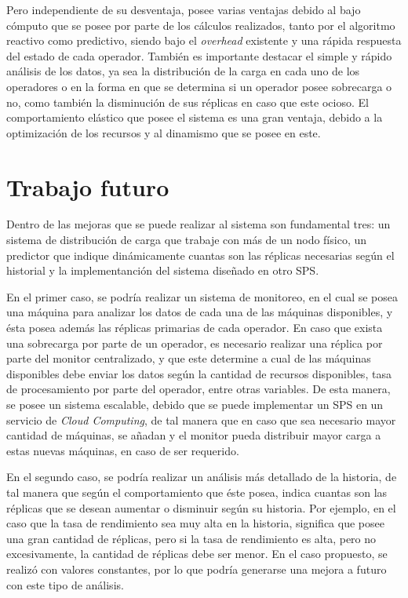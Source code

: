 Pero independiente de su desventaja, posee varias ventajas debido al bajo cómputo que se posee por parte de los cálculos realizados, tanto por el algoritmo reactivo como predictivo, siendo bajo el \textit{overhead} existente y una rápida respuesta del estado de cada operador. También es importante destacar el simple y rápido análisis de los datos, ya sea la distribución de la carga en cada uno de los operadores o en la forma en que se determina si un operador posee sobrecarga o no, como también la disminución de sus réplicas en caso que este ocioso. El comportamiento elástico que posee el sistema es una gran ventaja, debido a la optimización de los recursos y al dinamismo que se posee en este.

\section{Trabajo futuro}
Dentro de las mejoras que se puede realizar al sistema son fundamental tres: un sistema de distribución de carga que trabaje con más de un nodo físico, un predictor que indique dinámicamente cuantas son las réplicas necesarias según el historial y la implementanción del sistema diseñado en otro SPS.

En el primer caso, se podría realizar un sistema de monitoreo, en el cual se posea una máquina para analizar los datos de cada una de las máquinas disponibles, y ésta posea además las réplicas primarias de cada operador. En caso que exista una sobrecarga por parte de un operador, es necesario realizar una réplica por parte del monitor centralizado, y que este determine a cual de las máquinas disponibles debe enviar los datos según la cantidad de recursos disponibles, tasa de procesamiento por parte del operador, entre otras variables. De esta manera, se posee un sistema escalable, debido que se puede implementar un SPS en un servicio de \textit{Cloud Computing}, de tal manera que en caso que sea necesario mayor cantidad de máquinas, se añadan y el monitor pueda distribuir mayor carga a estas nuevas máquinas, en caso de ser requerido.

En el segundo caso, se podría realizar un análisis más detallado de la historia, de tal manera que según el comportamiento que éste posea, indica cuantas son las réplicas que se desean aumentar o disminuir según su historia. Por ejemplo, en el caso que la tasa de rendimiento sea muy alta en la historia, significa que posee una gran cantidad de réplicas, pero si la tasa de rendimiento es alta, pero no excesivamente, la cantidad de réplicas debe ser menor. En el caso propuesto, se realizó con valores constantes, por lo que podría generarse una mejora a futuro con este tipo de análisis.

